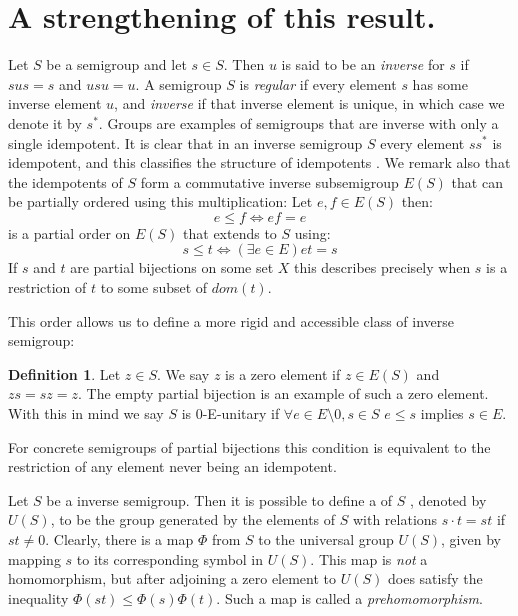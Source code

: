 \documentclass[11pt,a4paper]{amsart}
\theoremstyle{plain}
\theoremstyle{definition}%
\newtheorem{definition}[theorem]{Definition}%
\theoremstyle{remark}%
\begin{document}
\section{A strengthening of this result.}

Let $S$ be a semigroup and let $s \in S$. Then $u$ is said to be an \textit{inverse} for $s$ if $sus=s$ and $usu=u$. A semigroup $S$ is \textit{regular} if every element $s$ has some inverse element $u$, and \textit{inverse} if that inverse element is unique, in which case we denote it by $s^{*}$. Groups are examples of semigroups that are inverse with only a single idempotent. It is clear that in an inverse semigroup $S$ every element $ss^{*}$ is idempotent, and this classifies the structure of idempotents \cite{}. We remark also that the idempotents of $S$ form a commutative inverse subsemigroup $E(S)$ that can be partially ordered using this multiplication: Let $e,f \in E(S)$ then:
\begin{equation*}
e \leq f \Leftrightarrow ef=e
\end{equation*}
is a partial order on $E(S)$ that extends to $S$ using:
\begin{equation*}
s \leq t \Leftrightarrow (\exists e \in E) et=s
\end{equation*}
If $s$ and $t$ are partial bijections on some set $X$ this describes precisely when $s$ is a restriction of $t$ to some subset of $dom(t)$.

This order allows us to define a more rigid and accessible class of inverse semigroup:


\begin{definition}
Let $z \in S$. We say $z$ is a zero element if $z \in E(S)$ and $zs=sz=z$. The empty partial bijection is an example of such a zero element. With this in mind we say $S$ is 0-E-unitary if $\forall e \in E\setminus 0, s \in S$ $e \leq s$ implies $s \in E$.
\end{definition}

For concrete semigroups of partial bijections this condition is equivalent to the restriction of any element never being an idempotent.

Let $S$ be a inverse semigroup. Then it is possible to define a  of $S$ \cite{}, denoted by $U(S)$, to be the group generated by the elements of $S$ with relations $s\cdot t = st$ if $st \not = 0$. Clearly, there is a map $\Phi$ from $S$ to the universal group $U(S)$, given by mapping $s$ to its corresponding symbol in $U(S)$. This map is \textit{not} a homomorphism, but after adjoining a zero element to $U(S)$ does satisfy the inequality $\Phi(st) \leq \Phi(s)\Phi(t)$. Such a map is called a \textit{prehomomorphism}. 
\end{document}
